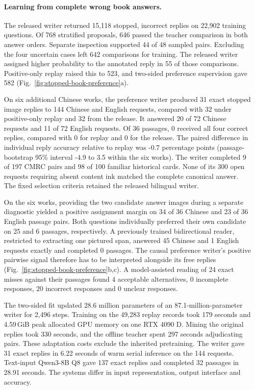\paragraph{Learning from complete wrong book answers.}
The released writer returned 15,118 stopped, incorrect replies on 22,902 training questions. Of 768 stratified proposals, 646 passed the teacher comparison in both answer orders. Separate inspection supported 44 of 48 sampled pairs. Excluding the four uncertain cases left 642 comparisons for training. The released writer assigned higher probability to the annotated reply in 55 of those comparisons. Positive-only replay raised this to 523, and two-sided preference supervision gave 582 (Fig.~\ref{fig:stopped-book-preference}a).

On six additional Chinese works, the preference writer produced 31 exact stopped image replies to 144 Chinese and English requests, compared with 32 under positive-only replay and 32 from the release. It answered 20 of 72 Chinese requests and 11 of 72 English requests. Of 36 passages, 0 received all four correct replies, compared with 0 for replay and 0 for the release. The paired difference in individual reply accuracy relative to replay was -0.7 percentage points (passage-bootstrap 95\% interval -4.9 to 3.5 within the six works). The writer completed 9 of 197 CMRC pairs and 98 of 100 familiar historical cards. None of its 300 open requests requiring absent content ink matched the complete canonical answer. The fixed selection criteria retained the released bilingual writer.

On the six works, providing the two candidate answer images during a separate diagnostic yielded a positive assignment margin on 34 of 36 Chinese and 23 of 36 English passage pairs. Both questions individually preferred their own candidate on 25 and 6 passages, respectively. A previously trained bidirectional reader, restricted to extracting one pictured span, answered 45 Chinese and 1 English requests exactly and completed 0 passages. The causal preference writer's positive pairwise signal therefore has to be interpreted alongside its free replies (Fig.~\ref{fig:stopped-book-preference}b,c). A model-assisted reading of 24 exact misses against their passages found 4 acceptable alternatives, 0 incomplete responses, 20 incorrect responses and 0 unclear responses.

The two-sided fit updated 28.6 million parameters of an 87.1-million-parameter writer for 2,496 steps. Training on the 49,283 replay records took 179 seconds and 4.59\,GiB peak allocated GPU memory on one RTX 4090 D. Mining the original replies took 330 seconds, and the offline teacher spent 297 seconds adjudicating pairs. These adaptation costs exclude the inherited pretraining. The writer gave 31 exact replies in 6.22 seconds of warm serial inference on the 144 requests. Text-input Qwen3-8B Q8 gave 137 exact replies and completed 32 passages in 28.91 seconds. The systems differ in input representation, output interface and accuracy.

